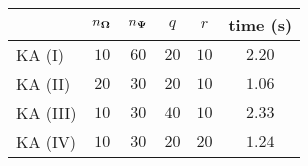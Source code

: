 \centering
\renewcommand{\arraystretch}{1.2}
\begin{tabular}{@{}lccccc@{}}
\toprule
 & $n_{\boldsymbol{\Omega}}$ & $n_{\boldsymbol{\Psi}}$ & $q$ & $r$ & time (s)\\
\midrule
KA (I) & $10$ & $60$ & $20$ & $10$ & $2.20$ \\
KA (II) & $20$ & $30$ & $20$ & $10$ & $1.06$ \\
KA (III) & $10$ & $30$ & $40$ & $10$ & $2.33$ \\
KA (IV) & $10$ & $30$ & $20$ & $20$ & $1.24$ \\
\bottomrule
\end{tabular}
